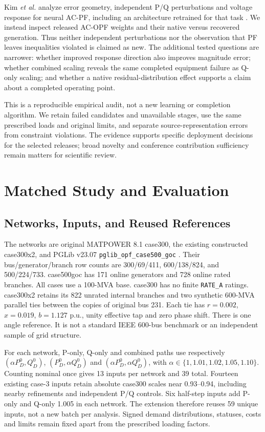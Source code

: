 \documentclass[conference,letterpaper]{IEEEtran}
\begin{document}
Kim \emph{et al.} analyze error geometry, independent P/Q perturbations and voltage response for neural AC-PF, including an architecture retrained for that task \cite{kim}. We instead inspect released AC-OPF weights and their native versus recovered generation. Thus neither independent perturbations nor the observation that PF leaves inequalities violated is claimed as new. The additional tested questions are narrower: whether improved response direction also improves magnitude error; whether combined scaling reveals the same completed equipment failure as Q-only scaling; and whether a native residual-distribution effect supports a claim about a completed operating point.

This is a reproducible empirical audit, not a new learning or completion algorithm. We retain failed candidates and unavailable stages, use the same prescribed loads and original limits, and separate source-representation errors from constraint violations. The evidence supports specific deployment decisions for the selected releases; broad novelty and conference contribution sufficiency remain matters for scientific review.

\section{Matched Study and Evaluation}
\subsection{Networks, Inputs, and Reused References}
The networks are original MATPOWER 8.1 case300, the existing constructed case300x2, and PGLib v23.07 \texttt{pglib\_opf\_case500\_goc} \cite{matpower,pglib}. Their bus/generator/branch row counts are 300/69/411, 600/138/824, and 500/224/733. case500goc has 171 online generators and 728 online rated branches. All cases use a 100-MVA base. case300 has no finite \texttt{RATE\_A} ratings. case300x2 retains its 822 unrated internal branches and two synthetic 600-MVA parallel ties between the copies of original bus 231. Each tie has $r=0.002$, $x=0.019$, $b=1.127$ p.u., unity effective tap and zero phase shift. There is one angle reference. It is not a standard IEEE 600-bus benchmark or an independent sample of grid structure.

For each network, P-only, Q-only and combined paths use respectively $(\alpha P_D^0,Q_D^0)$, $(P_D^0,\alpha Q_D^0)$ and $(\alpha P_D^0,\alpha Q_D^0)$, with $\alpha\in\{1,1.01,1.02,1.05,1.10\}$. Counting nominal once gives 13 inputs per network and 39 total. Fourteen existing case-3 inputs retain absolute case300 scales near 0.93--0.94, including nearby refinements and independent P/Q controls. Six half-step inputs add P-only and Q-only 1.005 in each network. The extension therefore reuses 59 unique inputs, not a new batch per analysis. Signed demand distributions, statuses, costs and limits remain fixed apart from the prescribed loading factors.
\end{document}
